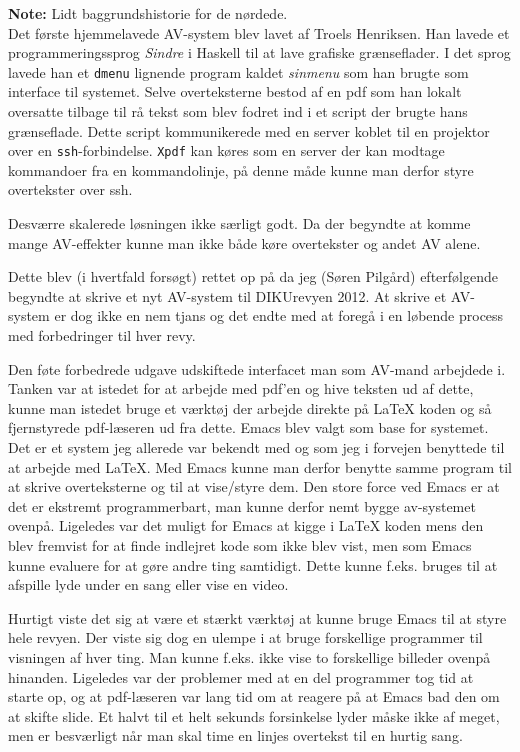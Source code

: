 \documentclass[10pt,a4paper,danish]{article}
\newcommand{\note}[1]{\begin{mdframed}[style=note]\textbf{Note:}
    #1\end{mdframed}}
\begin{document}
\note{Lidt baggrundshistorie for de nørdede.\\
  Det første hjemmelavede AV-system blev lavet af Troels Henriksen.
  Han lavede et programmeringssprog \textit{Sindre} i Haskell til at lave
  grafiske grænseflader. I det sprog lavede han et \texttt{dmenu} lignende program
  kaldet \textit{sinmenu} som han brugte som interface til systemet. Selve overteksterne
  bestod af en pdf som han lokalt oversatte tilbage til rå tekst som blev fodret ind i
  et script der brugte hans grænseflade. Dette script kommunikerede med en
  server koblet til en projektor over en \texttt{ssh}-forbindelse. \texttt{Xpdf} kan
  køres som en server der kan modtage kommandoer fra en kommandolinje, på denne
  måde kunne man derfor styre overtekster over ssh.

  Desværre skalerede løsningen ikke særligt godt. Da der begyndte at komme mange
  AV-effekter kunne man ikke både køre overtekster og andet AV alene.

  Dette blev (i hvertfald forsøgt) rettet op på da jeg (Søren Pilgård) efterfølgende begyndte at skrive et nyt
  AV-system til DIKUrevyen 2012.
  At skrive et AV-system er dog ikke en nem tjans og det endte med at foregå i en
  løbende process med forbedringer til hver revy.

  Den føte forbedrede udgave udskiftede interfacet man som AV-mand arbejdede i.
  Tanken var at istedet for at arbejde med pdf'en og hive teksten ud af dette,
  kunne man istedet bruge et værktøj der arbejde direkte på \LaTeX{} koden og så
  fjernstyrede pdf-læseren ud fra dette. Emacs blev valgt som base for systemet.
  Det er et system jeg allerede var bekendt med og som jeg i forvejen benyttede
  til at arbejde med \LaTeX{}. Med Emacs kunne man derfor benytte samme program
  til at skrive overteksterne og til at vise/styre dem.
  Den store force ved Emacs er at det er ekstremt programmerbart, man kunne
  derfor nemt bygge av-systemet ovenpå. Ligeledes var det muligt for Emacs at
  kigge i \LaTeX{} koden mens den blev fremvist for at finde indlejret kode som
  ikke blev vist, men som Emacs kunne evaluere for at gøre andre ting samtidigt.
  Dette kunne f.eks. bruges til at afspille lyde under en sang eller vise en
  video.

  Hurtigt viste det sig at være et stærkt værktøj at kunne bruge Emacs til at
  styre hele revyen. Der viste sig dog en ulempe i at bruge forskellige
  programmer til visningen af hver ting. Man kunne f.eks. ikke vise to
  forskellige billeder ovenpå hinanden.
  Ligeledes var der problemer med at en del programmer tog tid at starte op, og
  at pdf-læseren var lang tid om at reagere på at Emacs bad den om at skifte
  slide. Et halvt til et helt sekunds forsinkelse lyder måske ikke af meget, men
  er besværligt når man skal time en linjes overtekst til en hurtig sang.

}
\end{document}
